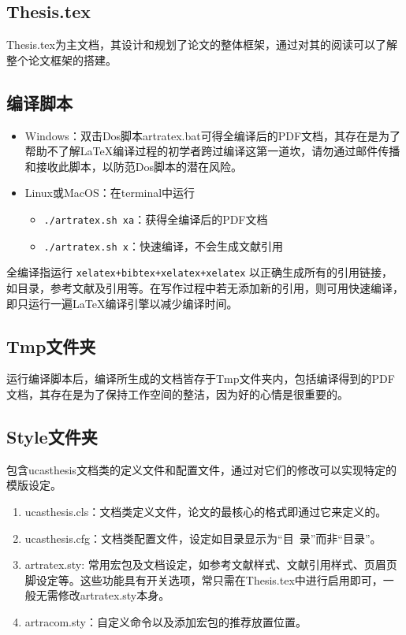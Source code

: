 \subsection{Thesis.tex}

Thesis.tex为主文档，其设计和规划了论文的整体框架，通过对其的阅读可以了解整个论文框架的搭建。

\subsection{编译脚本}

\begin{itemize}
    \item Windows：双击Dos脚本artratex.bat可得全编译后的PDF文档，其存在是为了帮助不了解\LaTeX{}编译过程的初学者跨过编译这第一道坎，请勿通过邮件传播和接收此脚本，以防范Dos脚本的潜在风险。
    \item Linux或MacOS：在terminal中运行
        \begin{itemize}
            \item \verb|./artratex.sh xa|：获得全编译后的PDF文档
            \item \verb|./artratex.sh x|：快速编译，不会生成文献引用
        \end{itemize}
\end{itemize}

全编译指运行 \verb|xelatex+bibtex+xelatex+xelatex| 以正确生成所有的引用链接，如目录，参考文献及引用等。在写作过程中若无添加新的引用，则可用快速编译，即只运行一遍\LaTeX{}编译引擎以减少编译时间。

\subsection{Tmp文件夹}

运行编译脚本后，编译所生成的文档皆存于Tmp文件夹内，包括编译得到的PDF文档，其存在是为了保持工作空间的整洁，因为好的心情是很重要的。

\subsection{Style文件夹}

包含ucasthesis文档类的定义文件和配置文件，通过对它们的修改可以实现特定的模版设定。

\begin{enumerate}
    \item ucasthesis.cls：文档类定义文件，论文的最核心的格式即通过它来定义的。
    \item ucasthesis.cfg：文档类配置文件，设定如目录显示为“目~录”而非“目录”。
    \item artratex.sty: 常用宏包及文档设定，如参考文献样式、文献引用样式、页眉页脚设定等。这些功能具有开关选项，常只需在Thesis.tex中进行启用即可，一般无需修改artratex.sty本身。
    \item artracom.sty：自定义命令以及添加宏包的推荐放置位置。
\end{enumerate}

